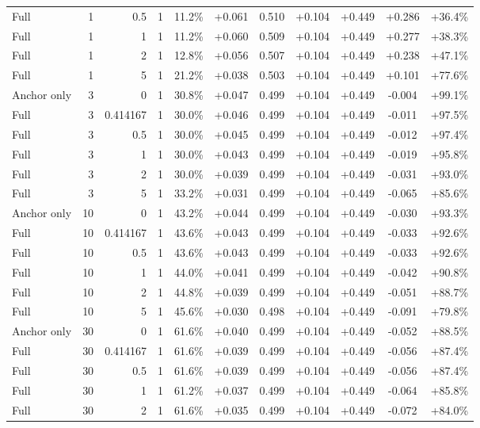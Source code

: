 \begin{table}[htbp]
\begin{tabular}{lrrrccccccc}
Full & 1 & 0.5 & 1 & 11.2\% & +0.061 & 0.510 & +0.104 & +0.449 & +0.286 & +36.4\% \\
Full & 1 & 1 & 1 & 11.2\% & +0.060 & 0.509 & +0.104 & +0.449 & +0.277 & +38.3\% \\
Full & 1 & 2 & 1 & 12.8\% & +0.056 & 0.507 & +0.104 & +0.449 & +0.238 & +47.1\% \\
Full & 1 & 5 & 1 & 21.2\% & +0.038 & 0.503 & +0.104 & +0.449 & +0.101 & +77.6\% \\
Anchor only & 3 & 0 & 1 & 30.8\% & +0.047 & 0.499 & +0.104 & +0.449 & -0.004 & +99.1\% \\
Full & 3 & 0.414167 & 1 & 30.0\% & +0.046 & 0.499 & +0.104 & +0.449 & -0.011 & +97.5\% \\
Full & 3 & 0.5 & 1 & 30.0\% & +0.045 & 0.499 & +0.104 & +0.449 & -0.012 & +97.4\% \\
Full & 3 & 1 & 1 & 30.0\% & +0.043 & 0.499 & +0.104 & +0.449 & -0.019 & +95.8\% \\
Full & 3 & 2 & 1 & 30.0\% & +0.039 & 0.499 & +0.104 & +0.449 & -0.031 & +93.0\% \\
Full & 3 & 5 & 1 & 33.2\% & +0.031 & 0.499 & +0.104 & +0.449 & -0.065 & +85.6\% \\
Anchor only & 10 & 0 & 1 & 43.2\% & +0.044 & 0.499 & +0.104 & +0.449 & -0.030 & +93.3\% \\
Full & 10 & 0.414167 & 1 & 43.6\% & +0.043 & 0.499 & +0.104 & +0.449 & -0.033 & +92.6\% \\
Full & 10 & 0.5 & 1 & 43.6\% & +0.043 & 0.499 & +0.104 & +0.449 & -0.033 & +92.6\% \\
Full & 10 & 1 & 1 & 44.0\% & +0.041 & 0.499 & +0.104 & +0.449 & -0.042 & +90.8\% \\
Full & 10 & 2 & 1 & 44.8\% & +0.039 & 0.499 & +0.104 & +0.449 & -0.051 & +88.7\% \\
Full & 10 & 5 & 1 & 45.6\% & +0.030 & 0.498 & +0.104 & +0.449 & -0.091 & +79.8\% \\
Anchor only & 30 & 0 & 1 & 61.6\% & +0.040 & 0.499 & +0.104 & +0.449 & -0.052 & +88.5\% \\
Full & 30 & 0.414167 & 1 & 61.6\% & +0.039 & 0.499 & +0.104 & +0.449 & -0.056 & +87.4\% \\
Full & 30 & 0.5 & 1 & 61.6\% & +0.039 & 0.499 & +0.104 & +0.449 & -0.056 & +87.4\% \\
Full & 30 & 1 & 1 & 61.2\% & +0.037 & 0.499 & +0.104 & +0.449 & -0.064 & +85.8\% \\
Full & 30 & 2 & 1 & 61.6\% & +0.035 & 0.499 & +0.104 & +0.449 & -0.072 & +84.0\% \\

\end{tabular}
\end{table}
